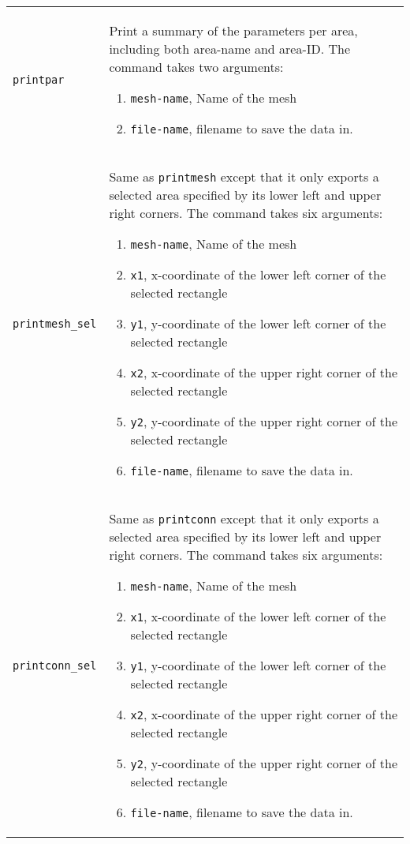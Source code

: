 \documentclass[noshowpacs,preprintnumbers,amsmath,amssymb, letter]{revtex4}
\begin{document}
\begin{longtable}{p{}p{}}
\texttt{printpar}	& Print a summary of the parameters per area, including both area-name and area-ID. The command takes two arguments:
\begin{enumerate}
\item \texttt{mesh-name}, Name of the mesh
\item \texttt{file-name}, filename to save the data in.
\end{enumerate}\\
\texttt{printmesh\_sel}	& Same as \texttt{printmesh} except that it only exports a selected area specified by its lower left and upper right corners. The command takes six arguments:
\begin{enumerate}
\item \texttt{mesh-name}, Name of the mesh
\item \texttt{x1}, x-coordinate of the lower left corner of the selected rectangle
\item \texttt{y1}, y-coordinate of the lower left corner of the selected rectangle
\item \texttt{x2}, x-coordinate of the upper right corner of the selected rectangle
\item \texttt{y2}, y-coordinate of the upper right corner of the selected rectangle
\item \texttt{file-name}, filename to save the data in.
\end{enumerate}\\
\texttt{printconn\_sel}	& Same as \texttt{printconn} except that it only exports a selected area specified by its lower left and upper right corners. The command takes six arguments:
\begin{enumerate}
\item \texttt{mesh-name}, Name of the mesh
\item \texttt{x1}, x-coordinate of the lower left corner of the selected rectangle
\item \texttt{y1}, y-coordinate of the lower left corner of the selected rectangle
\item \texttt{x2}, x-coordinate of the upper right corner of the selected rectangle
\item \texttt{y2}, y-coordinate of the upper right corner of the selected rectangle
\item \texttt{file-name}, filename to save the data in.

\end{enumerate}
\end{longtable}
\end{document}
